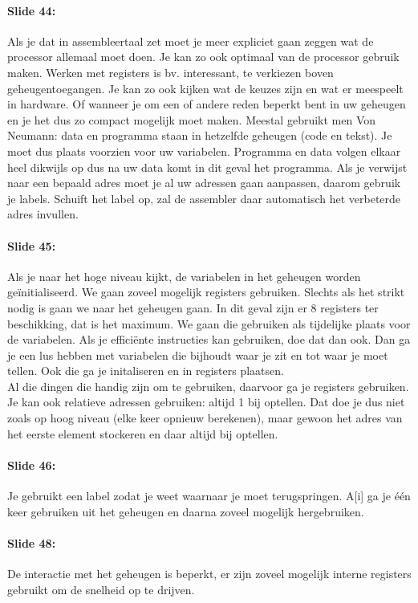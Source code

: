 \documentclass[10pt,a4paper]{book}
\begin{document}
\paragraph{Slide 44:} Als je dat in assembleertaal zet moet je meer expliciet gaan zeggen wat de processor allemaal moet doen. Je kan zo ook optimaal van de processor gebruik maken. Werken met registers is bv. interessant, te verkiezen boven geheugentoegangen. Je kan zo ook kijken wat de keuzes zijn en wat er meespeelt in hardware. Of wanneer je om een of andere reden beperkt bent in uw geheugen en je het dus zo compact mogelijk moet maken. Meestal gebruikt men Von Neumann: data en programma staan in hetzelfde geheugen (code en tekst). Je moet dus plaats voorzien voor uw variabelen. Programma en data volgen elkaar heel dikwijls op dus na uw data komt in dit geval het programma. Als je verwijst naar een bepaald adres moet je al uw adressen gaan aanpassen, daarom gebruik je labels. Schuift het label op, zal de assembler daar automatisch het verbeterde adres invullen.

\paragraph{Slide 45:} Als je naar het hoge niveau kijkt, de variabelen in het geheugen worden ge\"initialiseerd. We gaan zoveel mogelijk registers gebruiken. Slechts als het strikt nodig is gaan we naar het geheugen gaan. In dit geval zijn er 8 registers ter beschikking, dat is het maximum. We gaan die gebruiken als tijdelijke plaats voor de variabelen. Als je effici\"ente instructies kan gebruiken, doe dat dan ook. Dan ga je een lus hebben met variabelen die bijhoudt waar je zit en tot waar je moet tellen. Ook die ga je initaliseren en in registers plaatsen.\\
Al die dingen die handig zijn om te gebruiken, daarvoor ga je registers gebruiken. Je kan ook relatieve adressen gebruiken: altijd 1 bij optellen. Dat doe je dus niet zoals op hoog niveau (elke keer opnieuw berekenen), maar gewoon het adres van het eerste element stockeren en daar altijd bij optellen.

\paragraph{Slide 46:} Je gebruikt een label zodat je weet waarnaar je moet terugspringen. A[i] ga je \'e\'en keer gebruiken uit het geheugen en daarna zoveel mogelijk hergebruiken.

\paragraph{Slide 48:} De interactie met het geheugen is beperkt, er zijn zoveel mogelijk interne registers gebruikt om de snelheid op te drijven.
\end{document}
